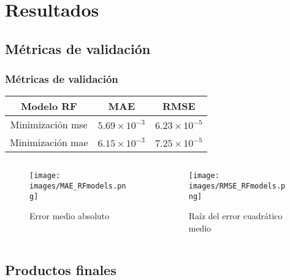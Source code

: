 \documentclass{beamer}
\begin{document}
  \section{Resultados}

  \subsection*{Métricas de validación}

  \begin{frame}
    \frametitle{Métricas de validación}

    \begin{center}
      \begin{tabular}{| c | c | c |}
        \hline
        Modelo RF& MAE & RMSE\\ \hline
        Minimización mse &  $5.69\times 10^{-3}$ & $6.23 \times 10^{-5}$\\
        Minimización mae &  $6.15\times 10^{-3}$ & $7.25 \times 10^{-5}$\\
        \hline
      \end{tabular}
      
    \end{center}

    \begin{columns}

      \begin{column}{0.5\textwidth}
        \begin{figure}
          \centering
          \texttt{[image: images/MAE\_RFmodels.png]}
          \caption{Error medio absoluto}
        \end{figure}
      \end{column}

      \begin{column}{0.5\textwidth}
        \begin{figure}
          \centering
          \texttt{[image: images/RMSE\_RFmodels.png]}
          \caption{Raíz del error cuadrático medio}
        \end{figure}
      \end{column}
    \end{columns}
  \end{frame}

  \subsection*{Productos finales}
\end{document}
